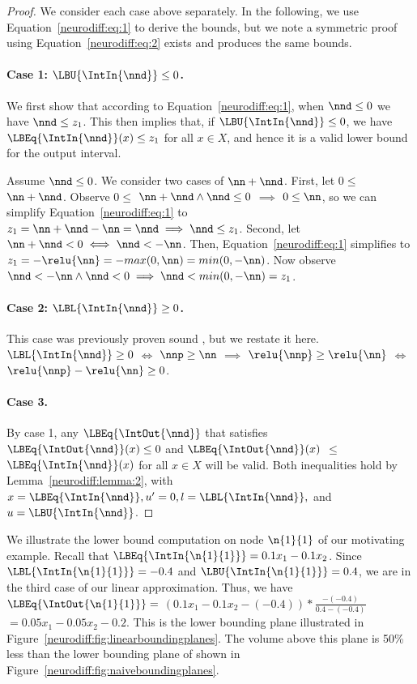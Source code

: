\begin{proof}
We consider each case above separately. In the following, we use
Equation~\ref{neurodiff:eq:1} to derive the bounds, but we note a symmetric proof
using
Equation~\ref{neurodiff:eq:2} exists and produces the same bounds.

\paragraph{Case 1: $ \LBU{\IntIn{\nnd}} \leq 0 $.}
We first show that according to Equation~\ref{neurodiff:eq:1}, when $ \nnd \leq 0
$ we
have $ \nnd \leq z_1 $. This then implies that, if $ \LBU{\IntIn{\nnd}} \leq 0
$, we have $ \LBEq{\IntIn{\nnd}}(x) \leq z_1 $ for all $ x \in X $, and hence
it is a valid lower bound for the output interval.

Assume $ \nnd \leq 0 $. We consider two cases of $ \nn + \nnd
$. First, let $ 0 \leq $ $ \nn + \nnd $. Observe $ 0 \leq $ $ \nn
+ \nnd \wedge \nnd \leq 0 $ $ \implies $ $ 0 \leq \nn $, so we can
simplify Equation~\ref{neurodiff:eq:1} to $ z_1 = \nn + \nnd - \nn
= \nnd \implies \nnd \leq z_1 $. Second, let $ \nn + \nnd <
0 \iff \nnd < -\nn $. Then, Equation~\ref{neurodiff:eq:1} simplifies to $ z_1 =
- \relu{\nn} = -max(0,\nn) = min(0, -\nn) $. Now observe $ \nnd <
-\nn \wedge \nnd < 0 \implies \nnd < min(0, -\nn) = z_1 $.

\paragraph{Case 2: $ \LBL{\IntIn{\nnd}} \geq 0 $.}
This case was previously proven sound \cite{PaulsenWW20}, but we
restate it here. $ \LBL{\IntIn{\nnd}} \geq 0 $ $ \iff $ $ \nnp \geq \nn $ $
\implies $ $ \relu{\nnp} \geq \relu{\nn} $ $ \iff $ $ \relu{\nnp} - \relu{\nn}
\geq 0 $.

\paragraph{Case 3.}
By case 1, any $ \LBEq{\IntOut{\nnd}} $ that satisfies
$ \LBEq{\IntOut{\nnd}}(x) \leq 0 $ and $ \LBEq{\IntOut{\nnd}}(x) $
$ \leq $ $ \LBEq{\IntIn{\nnd}}(x) $ for all $ x \in X $ will be valid. Both
inequalities hold by Lemma~\ref{neurodiff:lemma:2}, with $ x =
\LBEq{\IntIn{\nnd}}, u'
= 0, l = \LBL{\IntIn{\nnd}}, $ and $ u = \LBU{\IntIn{\nnd}} $.

\end{proof}


We illustrate the lower bound computation on node $ \n{1}{1} $ of our
motivating example. Recall that $ \LBEq{\IntIn{\n{1}{1}}} = 0.1x_1 -
0.1x_2 $. Since $ \LBL{\IntIn{\n{1}{1}}} = -0.4 $ and
$ \LBU{\IntIn{\n{1}{1}}} = 0.4 $, we are in the third case of our
linear approximation. Thus, we have $ \LBEq{\IntOut{\n{1}{1}}} = $ $
(0.1x_1 - 0.1x_2 - (-0.4))*\frac{-(-0.4)}{0.4 - (-0.4)} $$ = 0.05x_1 -
0.05x_2 - 0.2$. This is the lower bounding plane illustrated in
Figure~\ref{neurodiff:fig:linearboundingplanes}. The volume above this plane is
50\% less
than the lower bounding plane of \ReluDiff{} shown in
Figure~\ref{neurodiff:fig:naiveboundingplanes}.


